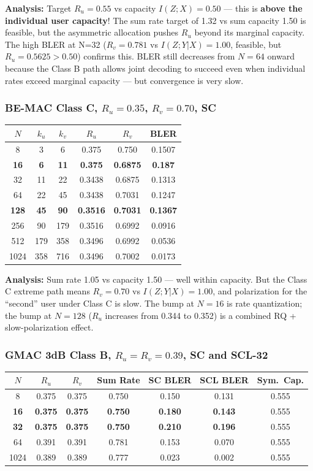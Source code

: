 \documentclass[11pt,a4paper]{article}
\newcommand{\up}[1]{\textcolor{upcolor}{\textbf{#1}}}
\begin{document}
\textbf{Analysis:} Target $R_u=0.55$ vs capacity $I(Z;X)=0.50$ — this is \textbf{above the individual user capacity}! The sum rate target of 1.32 vs sum capacity 1.50 is feasible, but the asymmetric allocation pushes $R_u$ beyond its marginal capacity. The high BLER at N=32 ($R_v=0.781$ vs $I(Z;Y|X)=1.00$, feasible, but $R_u=0.5625 > 0.50$) confirms this. BLER still decreases from $N=64$ onward because the Class B path allows joint decoding to succeed even when individual rates exceed marginal capacity — but convergence is very slow.

\subsubsection{BE-MAC Class C, $R_u=0.35$, $R_v=0.70$, SC}

\begin{tabular}{cccccc}
\toprule
$N$ & $k_u$ & $k_v$ & $R_u$ & $R_v$ & BLER \\
\midrule
8 & 3 & 6 & 0.375 & 0.750 & 0.1507 \\
\textbf{16} & \textbf{6} & \textbf{11} & \textbf{0.375} & \textbf{0.6875} & \up{0.187} \\
32 & 11 & 22 & 0.3438 & 0.6875 & 0.1313 \\
64 & 22 & 45 & 0.3438 & 0.7031 & 0.1247 \\
\textbf{128} & \textbf{45} & \textbf{90} & \textbf{0.3516} & \textbf{0.7031} & \up{0.1367} \\
256 & 90 & 179 & 0.3516 & 0.6992 & 0.0916 \\
512 & 179 & 358 & 0.3496 & 0.6992 & 0.0536 \\
1024 & 358 & 716 & 0.3496 & 0.7002 & 0.0173 \\
\bottomrule
\end{tabular}

\textbf{Analysis:} Sum rate 1.05 vs capacity 1.50 — well within capacity. But the Class C extreme path means $R_v=0.70$ vs $I(Z;Y|X)=1.00$, and polarization for the ``second'' user under Class C is slow. The bump at $N=16$ is rate quantization; the bump at $N=128$ ($R_u$ increases from 0.344 to 0.352) is a combined RQ + slow-polarization effect.

\subsubsection{GMAC 3dB Class B, $R_u=R_v=0.39$, SC and SCL-32}

\begin{tabular}{ccccccc}
\toprule
$N$ & $R_u$ & $R_v$ & Sum Rate & SC BLER & SCL BLER & Sym.\ Cap. \\
\midrule
8 & 0.375 & 0.375 & 0.750 & 0.150 & 0.131 & 0.555 \\
\textbf{16} & \textbf{0.375} & \textbf{0.375} & \textbf{0.750} & \up{0.180} & \up{0.143} & 0.555 \\
\textbf{32} & \textbf{0.375} & \textbf{0.375} & \textbf{0.750} & \up{0.210} & \up{0.196} & 0.555 \\
64 & 0.391 & 0.391 & 0.781 & 0.153 & 0.070 & 0.555 \\
1024 & 0.389 & 0.389 & 0.777 & 0.023 & 0.002 & 0.555 \\
\bottomrule
\end{tabular}
\end{document}
